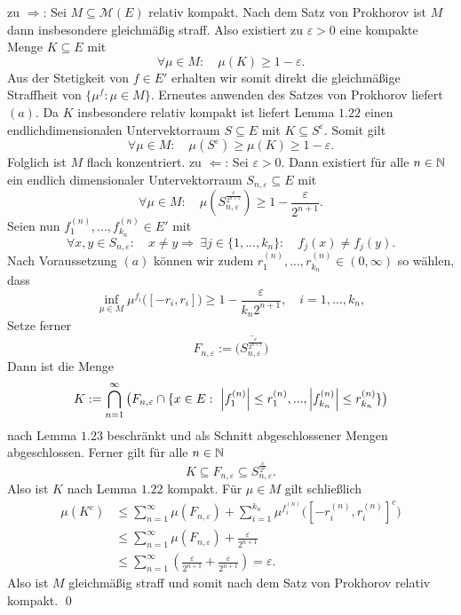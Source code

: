 \begin{proof*}
    zu $\Rightarrow$: 
    Sei $M \subseteq \mathcal{M}(E)$ relativ kompakt. Nach dem Satz von Prokhorov ist $M$ dann insbesondere gleichmäßig straff. 
    Also existiert zu $\varepsilon > 0$ eine kompakte Menge $K \subseteq E$ mit 
    $$
        \forall \mu \in M: \quad \mu(K) \geq 1 - \varepsilon.   
    $$ 
    Aus der Stetigkeit von $f \in E'$ erhalten wir somit direkt die gleichmäßige Straffheit von \mbox{$\{\mu^f : \mu \in M\}$}. Erneutes anwenden des Satzes von Prokhorov liefert $(a)$. 
    Da $K$ insbesondere relativ kompakt ist liefert Lemma $1.22$ einen endlichdimensionalen Untervektorraum $S \subseteq E$ mit $K \subseteq S^{\varepsilon}$. Somit gilt
    $$
        \forall \mu \in M: \quad \mu(S^{\varepsilon}) \geq \mu(K) \geq 1 - \varepsilon.
    $$
    Folglich ist $M$ flach konzentriert. 
    \newline 
    zu $\Leftarrow$: 
    Sei $\varepsilon > 0$. Dann existiert für alle $n \in \mathbb{N}$ ein endlich dimensionaler Untervektorraum $S_{n, \varepsilon} \subseteq E$ mit 
    $$
        \forall \mu \in M: \quad \mu(S_{n, \varepsilon}^{\frac{\varepsilon}{2^{n+1}}}) \geq 1 - \frac{\varepsilon}{2^{n+1}}.
    $$
    Seien nun $f_1^{(n)},...,f_{k_n}^{(n)} \in E'$ mit 
    $$
        \forall x,y \in S_{n, \varepsilon}: \quad x \neq y \Rightarrow \ \exists j \in \{1,...,k_n\}: \quad f_j(x) \neq f_j(y). 
    $$
    Nach Voraussetzung $(a)$ können wir zudem $r_1^{(n)},...,r_{k_n}^{(n)} \in (0, \infty)$ so wählen, dass
    $$
        \inf_{\mu \in M} \mu^{f_i}\big([-r_i, r_i]\big) \geq 1 - \frac{\varepsilon}{k_n 2^{n+1}}, \quad i=1,...,k_n,
    $$
    Setze ferner
    $$
        F_{n,\varepsilon} := \overline{\big(S_{n,\varepsilon}^{\frac{\varepsilon}{2^{n+1}}}\big)}
    $$
    Dann ist die Menge 
    $$
        K := \bigcap_{n =1}^{\infty}\big(F_{n, \varepsilon} \cap\{x \in E: \ \left| f_1^{(n)} \right|\leq r_1^{(n)},...,\left| f_{k_n}^{(n)} \right|\leq r_{k_n}^{(n)}\}\big)
    $$
    nach Lemma $1.23$ beschränkt und als Schnitt abgeschlossener Mengen abgeschlossen. Ferner gilt für alle $n \in \mathbb{N}$
    $$
        K \subseteq  F_{n, \varepsilon} \subseteq S_{n,\varepsilon}^{\frac{\varepsilon}{2^n}}.
    $$
    Also ist $K$ nach Lemma $1.22$ kompakt. Für $\mu \in M$ gilt schließlich
    \begin{align*}
        \mu(K^c) &\leq \sum_{n=1}^{\infty}\mu(F_{n, \varepsilon}) + \sum_{i=1}^{k_n}\mu^{f_i^{(n)}}\big([-r_i^{(n)}, r_i^{(n)}]^c\big) \\\
                 &\leq \sum_{n=1}^{\infty}\mu(F_{n, \varepsilon}) + \frac{\varepsilon}{2^{n+1}} \\\
                 &\leq \sum_{n=1}^{\infty}(\frac{\varepsilon}{2^{n+1}} + \frac{\varepsilon}{2^{n+1}}) = \varepsilon. 
    \end{align*}
    Also ist $M$ gleichmäßig straff und somit nach dem Satz von Prokhorov relativ kompakt. \qed
\end{proof*}

